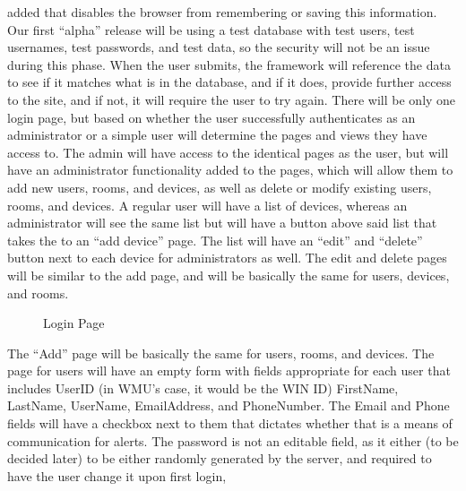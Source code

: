 \documentclass{report}
\begin{document}
added that disables the browser from remembering or saving this information. 
Our first “alpha” release will be using a test database with test users, test usernames, test passwords, and test data, so the security
will not be an issue during this phase. When the user submits, the framework will reference the data to see if it matches what is in the database, and if it does, provide further access to the site, and if not, it will require the user to try again. 
\newline
\indent
There will be only one login page, but based on whether the user successfully authenticates as an administrator or a simple user will determine the pages and views they have access to. 
The admin will have access to the identical pages as the user, but will have an administrator functionality added to the pages, which will allow them to add new users, rooms, and devices, as well as delete or modify existing users, rooms, and devices. 
A regular user will have a list of devices, whereas an administrator will see the same list but will have a button above said list that takes the to an “add device” page.  
The list will have an “edit” and “delete” button next to each device for administrators as well. The edit and delete pages will be similar to the add page, and will be basically the same for users, devices, and rooms. 
\begin{figure}[H]
\caption{Login Page}
\end{figure}
The “Add” page will be basically the same for users, rooms, and devices. 
The page for users will have an empty form with fields appropriate for each user that includes UserID (in WMU’s case, it would be the WIN ID) FirstName, LastName, UserName, EmailAddress, and PhoneNumber. 
The Email and Phone fields will have a checkbox next to them that dictates whether that is a means of communication for alerts. 
The password is not an editable field, as it either (to be decided later) to be either randomly generated by the server, and required to have the user change it upon first login, 
\end{document}
